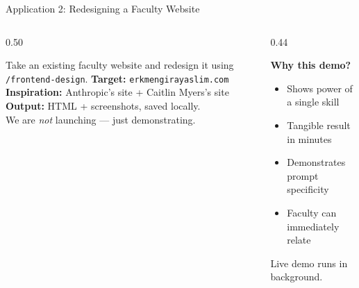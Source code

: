 \documentclass[aspectratio=169, 10pt]{beamer}
\begin{document}
\begin{frame}{Application 2: Redesigning a Faculty Website}
\begin{columns}[T]
\begin{column}{0.50\textwidth}
\begin{tcolorbox}[keybox, title={\faGlobe\quad The Task}]
\small
Take an existing faculty website and redesign it using \texttt{/frontend-design}.
\vskip3pt
\textbf{Target:} \texttt{erkmengirayaslim.com}\\
\textbf{Inspiration:} Anthropic's site + Caitlin Myers's site\\
\textbf{Output:} HTML + screenshots, saved locally.\\
We are \textit{not} launching --- just demonstrating.
\end{tcolorbox}
\end{column}
\begin{column}{0.44\textwidth}
\vskip2pt
\begin{tcolorbox}[accentbox]
\small
\textbf{Why this demo?}
\begin{itemize}\setlength{\itemsep}{0pt}\small
  \item Shows power of a single skill
  \item Tangible result in minutes
  \item Demonstrates prompt specificity
  \item Faculty can immediately relate
\end{itemize}
\end{tcolorbox}
\vskip3pt
{\scriptsize\color{CoolGray} \faPlay\; Live demo runs in background.}
\end{column}
\end{columns}
\end{frame}
\end{document}
